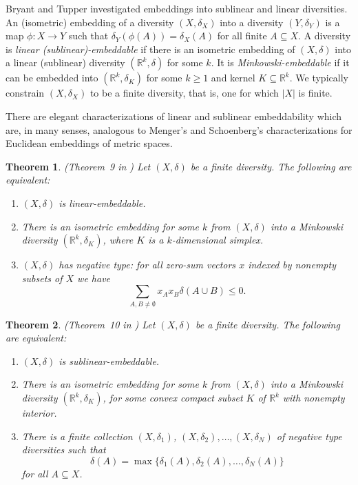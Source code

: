 \documentclass{article}
\theoremstyle{plain}
\newtheorem{theorem}{Theorem}
\theoremstyle{definition}
\renewcommand{\Re}{\mathbb{R}}
\begin{document}
Bryant and Tupper \cite{bryant2024linear} investigated embeddings into sublinear and linear diversities. An (isometric) embedding of a diversity $(X,\delta_X)$ into a diversity $(Y,\delta_Y)$ is a map $\phi:X \rightarrow Y$ such that $\delta_Y(\phi(A)) = \delta_X(A)$ for all finite $A \subseteq X$. A diversity is  {\em linear (sublinear)-embeddable} if there is an isometric embedding of $(X,\delta)$ into a linear (sublinear) diversity $(\Re^k,\delta)$ for some $k$. It is {\em Minkowski-embeddable} if it can be embedded into $(\Re^k,\delta_K)$ for some $k \geq 1$ and kernel $K \subseteq \Re^k$. We typically constrain $(X,\delta_X)$ to be a finite diversity, that is, one for which $|X|$ is finite. 

There are elegant characterizations of linear and sublinear embeddability which are, in many senses, analogous to Menger's and Schoenberg's characterizations for Euclidean embeddings of metric spaces. 

\begin{theorem} \label{thm:linearChar} (Theorem~9 in \cite{bryant2024linear})
Let $(X,\delta)$ be a finite diversity. The following are equivalent:
\begin{enumerate}
\item $(X,\delta)$ is linear-embeddable.
\item There is an isometric embedding for some $k$ from $(X,\delta)$ into a Minkowski diversity $(\Re^k,\delta_K)$, where $K$ is a $k$-dimensional simplex.
\item $(X,\delta)$ has negative type: for all zero-sum vectors $x$ indexed by nonempty subsets of $X$ we have
\[\sum_{A,B \neq \emptyset} x_A x_B \delta(A \cup B) \leq 0.\]
\end{enumerate}
\end{theorem}

\begin{theorem} \label{thm:sublinearChar} (Theorem~10 in \cite{bryant2024linear} ) 
Let $(X,\delta)$ be a finite diversity. The following are equivalent:
\begin{enumerate}
\item $(X,\delta)$ is sublinear-embeddable.
\item There is an isometric embedding for some $k$ from $(X,\delta)$ into a Minkowski diversity $(\Re^k,\delta_K)$, for some convex compact subset $K$ of $\Re^k$ with nonempty interior.
\item There is a finite collection $(X,\delta_1)$, $(X,\delta_2),\ldots,(X,\delta_N)$ of negative type diversities such that 
\[ \delta(A) = \max\{\delta_1(A),\delta_2(A),\ldots,\delta_N(A)\}\]
for all $A \subseteq X$.
\end{enumerate}
\end{theorem}
~\\
\end{document}
